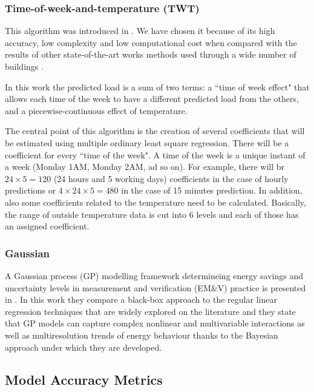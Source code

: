 \documentclass[10pt, conference, compsocconf]{IEEEtran}
\begin{document}
\subsubsection{Time-of-week-and-temperature (TWT)}

This algorithm was introduced in \cite{mathieu2011quantifying}. We have chosen it because of its high accuracy, low complexity and low computational cost when compared with the results of other state-of-the-art works methods used through a wide number of buildings \cite{granderson2016accuracy}. 

In this work the predicted load is a sum of two terms: a ``time of week effect" that allows each time of the week to have a different predicted load from the others, and a piecewise-continuous effect of temperature. 

The central point of this algorithm is the creation of several coefficients that will be estimated using multiple ordinary least square regression. There will be a coefficient for every ``time of the week". A time of the week is a unique instant of a week (Monday 1AM, Monday 2AM, ad so on). For example, there will br $24 \times 5 = 120$ (24 hours and 5 working days) coefficients in the case of hourly predictions or  $4\times 24 \times 5 = 480$ in the case of 15 minutes prediction. In addition, also some coefficients related to the temperature need to be calculated. Basically, the range of outside temperature data is cut into 6 levels and each of those has an assigned coefficient.

\subsubsection{Gaussian}

A Gaussian process (GP) modelling framework determineing energy savings and uncertainty levels in measurement and verification (EM\&V) practice is presented in \cite{heo2012gaussian}.  In this work they compare a black-box approach to the regular linear regression techniques that are widely explored on the literature and they state that GP models can capture complex nonlinear and multivariable interactions as well as multiresolution trends of energy behaviour thanks to the Bayesian approach under which they are developed. 

\subsection{Model Accuracy Metrics}
\end{document}
